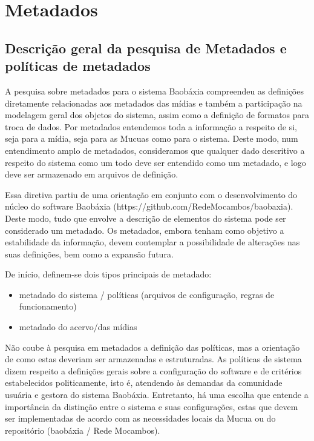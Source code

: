 \chapter{Metadados}\label{Metadados}\lhead{\leftmark}

\section{Descrição geral da pesquisa de Metadados e políticas de metadados}
A pesquisa sobre metadados para o sistema Baobáxia compreendeu as
definições diretamente relacionadas aos metadados das mídias e também
a participação na modelagem geral dos objetos do sistema, assim como a
definição de formatos para troca de dados. Por metadados entendemos
toda a informação a respeito de si, seja para a mídia, seja para as
Mucuas como para o sistema. Deste modo, num entendimento amplo de
metadados, consideramos que qualquer dado descritivo a respeito do
sistema como um todo deve ser entendido como um metadado, e logo deve
ser armazenado em arquivos de definição.

Essa diretiva partiu de uma orientação em conjunto com o
desenvolvimento do núcleo do software Baobáxia
(https://github.com/RedeMocambos/baobaxia). Deste modo, tudo que
envolve a descrição de elementos do sistema pode ser considerado um
metadado. Os metadados, embora tenham como objetivo a estabilidade da
informação, devem contemplar a possibilidade de alterações nas suas
definições, bem como a expansão futura.

De início, definem-se dois tipos principais de metadado:
\begin{itemize}
\item metadado do sistema / políticas (arquivos de configuração,
  regras de funcionamento)
\item metadado do acervo/das mídias
\end{itemize}

Não coube à pesquisa em metadados a definição das políticas, mas a
orientação de como estas deveriam ser armazenadas e estruturadas. As
políticas de sistema dizem respeito a definições gerais sobre a
configuração do software e de critérios estabelecidos politicamente,
isto é, atendendo às demandas da comunidade usuária e gestora do
sistema Baobáxia. Entretanto, há uma escolha que entende a importância
da distinção entre o sistema e suas configurações, estas que devem ser
implementadas de acordo com as necessidades locais da Mucua ou do
repositório (baobáxia / Rede Mocambos).

